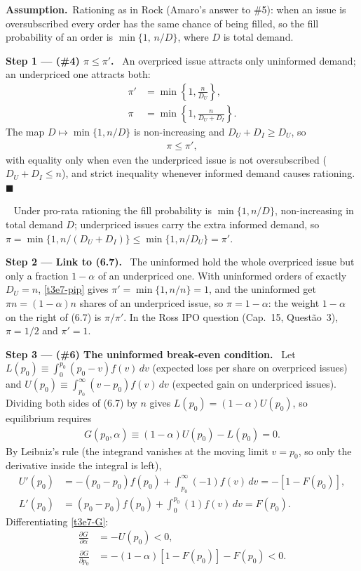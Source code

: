 \documentclass[11pt,a4paper]{article}
\newcommand{\step}[2]{\par\medskip\noindent\textbf{Step #1 --- #2.}~}
\newcommand{\assume}{\par\smallskip\noindent\textbf{Assumption.}~}
\newcommand{\answer}[1]{\par\smallskip\noindent\fbox{\textbf{Answer #1.}}~}
\begin{document}
\assume Rationing as in Rock (Amaro's answer to \#5): when an issue is oversubscribed every order has the same chance of being filled, so the fill probability of an order is $\min\{1,\,n/D\}$, where $D$ is total demand.

\step{1}{(\#4) $\pi\le\pi'$} An overpriced issue attracts only uninformed demand; an underpriced one attracts both:
\begin{align}
  \pi' &= \min\left\{1,\frac{n}{D_U}\right\}, \label{t3e7-pip}\\
  \pi  &= \min\left\{1,\frac{n}{D_U+D_I}\right\}. \label{t3e7-pi}
\end{align}
The map $D\mapsto\min\{1,n/D\}$ is non-increasing and $D_U+D_I\ge D_U$, so
\begin{align}
  \pi \le \pi', \label{t3e7-ineq}
\end{align}
with equality only when even the underpriced issue is not oversubscribed ($D_U+D_I\le n$), and strict inequality whenever informed demand causes rationing. $\blacksquare$

\answer{(\#4)} Under pro-rata rationing the fill probability is $\min\{1,n/D\}$, non-increasing in total demand $D$; underpriced issues carry the extra informed demand, so $\pi=\min\{1,n/(D_U+D_I)\}\le\min\{1,n/D_U\}=\pi'$.

\step{2}{Link to (6.7)} The uninformed hold the whole overpriced issue but only a fraction $1-\alpha$ of an underpriced one. With uninformed orders of exactly $D_U=n$, \eqref{t3e7-pip} gives $\pi'=\min\{1,n/n\}=1$, and the uninformed get $\pi n=(1-\alpha)n$ shares of an underpriced issue, so $\pi=1-\alpha$: the weight $1-\alpha$ on the right of (6.7) is $\pi/\pi'$. In the Ross IPO question (Cap.~15, Quest\~ao~3), $\pi=1/2$ and $\pi'=1$.

\step{3}{(\#6) The uninformed break-even condition} Let $L(p_0)\equiv\int_0^{p_0}(p_0-v)f(v)\,dv$ (expected loss per share on overpriced issues) and $U(p_0)\equiv\int_{p_0}^{\infty}(v-p_0)f(v)\,dv$ (expected gain on underpriced issues). Dividing both sides of (6.7) by $n$ gives $L(p_0)=(1-\alpha)U(p_0)$, so equilibrium requires
\begin{align}
  G(p_0,\alpha) \equiv (1-\alpha)U(p_0) - L(p_0) = 0. \label{t3e7-G}
\end{align}
By Leibniz's rule (the integrand vanishes at the moving limit $v=p_0$, so only the derivative inside the integral is left),
\begin{align}
  U'(p_0) &= -(p_0-p_0)f(p_0)+\int_{p_0}^{\infty}(-1)f(v)\,dv = -[1-F(p_0)], \nonumber\\
  L'(p_0) &= (p_0-p_0)f(p_0)+\int_0^{p_0}(1)f(v)\,dv = F(p_0). \nonumber
\end{align}
Differentiating \eqref{t3e7-G}:
\begin{align}
  \frac{\partial G}{\partial\alpha} &= -U(p_0) < 0, \label{t3e7-Ga}\\
  \frac{\partial G}{\partial p_0} &= -(1-\alpha)[1-F(p_0)] - F(p_0) < 0. \label{t3e7-Gp}
\end{align}
\end{document}
